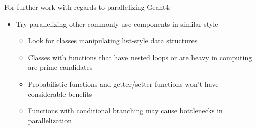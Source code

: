 \documentclass{beamer}
\begin{document}
\begin{frame}
For further work with regards to parallelizing Geant4:
\begin{itemize}
\item Try parallelizing other commonly use components in similar style
\begin{itemize}
\item Look for classes manipulating list-style data structures
\item Classes with functions that have nested loops or are heavy in computing are prime candidates
\item Probabilistic functions and getter/setter functions won't have considerable benefits
\item Functions with conditional branching may cause bottlenecks in parallelization
\end{itemize}
\end{itemize}
\end{frame}
\end{document}
